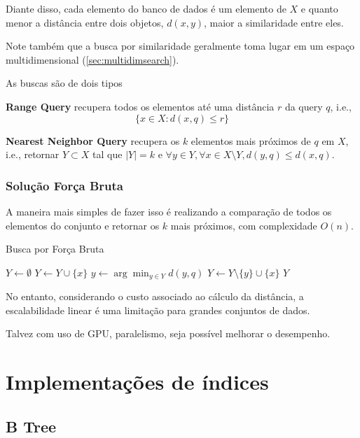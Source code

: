 Diante disso, cada elemento do banco de dados é um elemento de $X$ e quanto menor a distância entre dois objetos, $d(x, y)$, maior a similaridade entre eles.

Note também que a busca por similaridade geralmente toma lugar em um espaço multidimensional (\cref{sec:multidimsearch}).

As buscas são de dois tipos

\textbf{Range Query} recupera todos os elementos até uma distância $r$ da query $q$, i.e.,
$$\{x \in X : d(x, q) \le r\}$$

\textbf{Nearest Neighbor Query} recupera os $k$ elementos mais próximos de $q$ em $X$, i.e., retornar $Y \subset X$ tal que $|Y| = k$ e $\forall y \in Y, \forall x \in X \setminus Y, d(y, q) \le d(x, q)$.

\subsubsection{Solução Força Bruta}

A maneira mais simples de fazer isso é realizando a comparação de todos os elementos do conjunto e retornar os $k$ mais próximos, com complexidade $O(n)$.

\begin{algorithm}
\caption{Busca por Força Bruta}
\label{alg:bruteforce}
\begin{algorithmic}[1]
    \State $Y \gets \emptyset$
            \State $Y \gets Y \cup \{x\}$
        \Else
            \State $y \gets \arg\min_{y \in Y} d(y, q)$
                \State $Y \gets Y \setminus \{y\} \cup \{x\}$
            \EndIf
        \EndIf
    \EndFor
    \State \Return $Y$
\EndProcedure
\end{algorithmic}
\end{algorithm}

No entanto, considerando o custo associado ao cálculo da distância, a escalabilidade linear é uma limitação para grandes conjuntos de dados.

Talvez com uso de GPU, paralelismo, seja possível melhorar o desempenho.

\section{Implementações de índices}

\subsection{B Tree}

